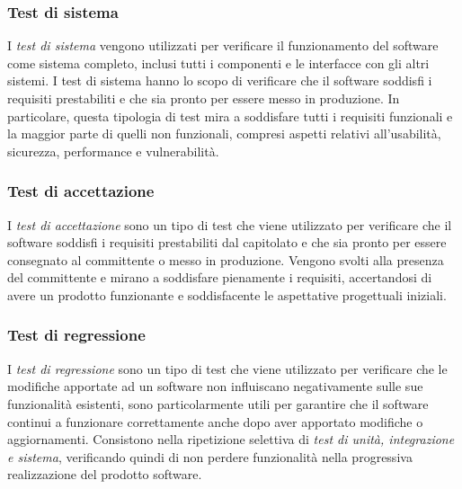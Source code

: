 \subsubsection{Test di sistema}

I \textit{test di sistema} vengono utilizzati per verificare il funzionamento del software come sistema
completo, inclusi tutti i componenti e le interfacce con gli altri sistemi. I test di sistema hanno lo
scopo di verificare che il software soddisfi i requisiti prestabiliti e che sia pronto per essere messo in
produzione. In particolare, questa tipologia di test mira a soddisfare tutti i requisiti funzionali e la maggior parte di quelli non funzionali, compresi aspetti relativi all’usabilità, sicurezza,
performance e vulnerabilità.

\subsubsection{Test di accettazione}

I \textit{test di accettazione} sono un tipo di test che viene utilizzato per verificare che il software soddisfi i requisiti prestabiliti dal capitolato e che sia pronto per essere consegnato al committente o messo in produzione.
Vengono svolti alla presenza del committente e mirano a soddisfare pienamente i requisiti,
accertandosi di avere un prodotto funzionante e soddisfacente le aspettative progettuali iniziali.

\subsubsection{Test di regressione}

I \textit{test di regressione} sono un tipo di test che viene utilizzato per verificare che le modifiche apportate ad un software non influiscano negativamente sulle sue funzionalità esistenti, sono particolarmente utili per garantire che il software continui a funzionare correttamente anche dopo aver apportato modifiche o aggiornamenti.
Consistono nella ripetizione selettiva di \textit{test di unità, integrazione e sistema}, verificando quindi di non perdere funzionalità nella progressiva realizzazione del prodotto software.


